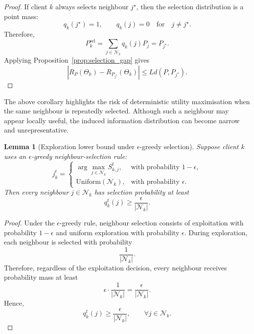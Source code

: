 \documentclass[conference]{IEEEtran}
\newtheorem{lemma}{Lemma}
\begin{document}
\begin{proof}
If client $k$ always selects neighbour $j^\star$, then the selection distribution is a point mass:
\begin{equation}
q_k(j^\star)=1,
\qquad
q_k(j)=0
\quad
\text{for}
\quad
j\neq j^\star.
    \label{eq:auto-059}
\end{equation}
Therefore,
\begin{equation}
P_k^{\mathrm{sel}}
=
\sum_{j\in\mathcal{N}_k}q_k(j)P_j
=
P_{j^\star}.
    \label{eq:auto-060}
\end{equation}
Applying Proposition~\ref{prop:selection_gap} gives
\begin{equation}
\left|
R_P(\Theta_k)
-
R_{P_{j^\star}}(\Theta_k)
\right|
\leq
L d(P,P_{j^\star}).
    \label{eq:auto-061}
\end{equation}
\end{proof}

The above corollary highlights the risk of deterministic utility maximisation when the same neighbour is repeatedly selected. Although such a neighbour may appear locally useful, the induced information distribution can become narrow and unrepresentative.

\begin{lemma}[Exploration lower bound under $\epsilon$-greedy selection]
\label{lem:epsilon_greedy}
Suppose client $k$ uses an $\epsilon$-greedy neighbour-selection rule:
\begin{equation}
j_k^t =
\begin{cases}
\arg\max_{j\in\mathcal{N}_k}S_{k,j}^t, & \text{with probability } 1-\epsilon,\\
\text{Uniform}(\mathcal{N}_k), & \text{with probability } \epsilon.
\end{cases}
    \label{eq:auto-062}
\end{equation}
Then every neighbour $j\in\mathcal{N}_k$ has selection probability at least
\begin{equation}
q_k^t(j)
\geq
\frac{\epsilon}{|\mathcal{N}_k|}.
    \label{eq:auto-063}
\end{equation}
\end{lemma}

\begin{proof}
Under the $\epsilon$-greedy rule, neighbour selection consists of exploitation with probability $1-\epsilon$ and uniform exploration with probability $\epsilon$. During exploration, each neighbour is selected with probability
\begin{equation}
\frac{1}{|\mathcal{N}_k|}.
    \label{eq:auto-064}
\end{equation}
Therefore, regardless of the exploitation decision, every neighbour receives probability mass at least
\begin{equation}
\epsilon \cdot \frac{1}{|\mathcal{N}_k|}
=
\frac{\epsilon}{|\mathcal{N}_k|}.
    \label{eq:auto-065}
\end{equation}
Hence,
\begin{equation}
q_k^t(j)
\geq
\frac{\epsilon}{|\mathcal{N}_k|},
\qquad
\forall j\in\mathcal{N}_k.
    \label{eq:auto-066}
\end{equation}
\end{proof}
\end{document}

